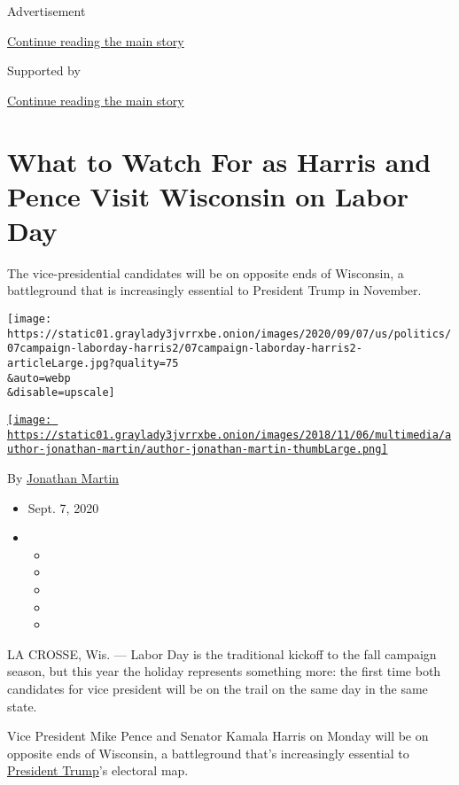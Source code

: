 Advertisement

\protect\hyperlink{after-top}{Continue reading the main story}

Supported by

\protect\hyperlink{after-sponsor}{Continue reading the main story}

\hypertarget{what-to-watch-for-as-harris-and-pence-visit-wisconsin-on-labor-day}{%
\section{What to Watch For as Harris and Pence Visit Wisconsin on Labor
Day}\label{what-to-watch-for-as-harris-and-pence-visit-wisconsin-on-labor-day}}

The vice-presidential candidates will be on opposite ends of Wisconsin,
a battleground that is increasingly essential to President Trump in
November.

\texttt{[image: https://static01.graylady3jvrrxbe.onion/images/2020/09/07/us/politics/07campaign-laborday-harris2/07campaign-laborday-harris2-articleLarge.jpg?quality=75\\\&auto=webp\\\&disable=upscale]}

\href{https://www.nytimes3xbfgragh.onion/by/jonathan-martin}{\texttt{[image: https://static01.graylady3jvrrxbe.onion/images/2018/11/06/multimedia/author-jonathan-martin/author-jonathan-martin-thumbLarge.png]}}

By \href{https://www.nytimes3xbfgragh.onion/by/jonathan-martin}{Jonathan
Martin}

\begin{itemize}
\item
  Sept. 7, 2020
\item
  \begin{itemize}
  \item
  \item
  \item
  \item
  \item
  \end{itemize}
\end{itemize}

LA CROSSE, Wis. --- Labor Day is the traditional kickoff to the fall
campaign season, but this year the holiday represents something more:
the first time both candidates for vice president will be on the trail
on the same day in the same state.

Vice President Mike Pence and Senator Kamala Harris on Monday will be on
opposite ends of Wisconsin, a battleground that's increasingly essential
to
\href{https://www.nytimes3xbfgragh.onion/interactive/2020/us/elections/donald-trump.html}{President
Trump}'s electoral map.

